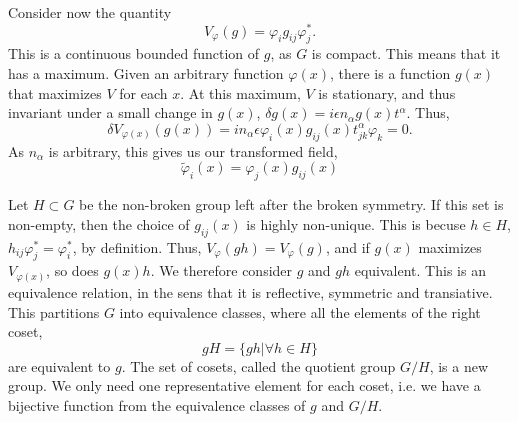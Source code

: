 Consider now the quantity
\begin{equation}
    V_{\varphi}(g) = \varphi_i g_{ij} \varphi^*_j.
\end{equation}
This is a continuous bounded function of $g$, as $G$ is compact.
This means that it has a maximum.
Given an arbitrary function $\varphi(x)$, there is a function $g(x)$ that maximizes $V$ for each $x$.
At this maximum, $V$ is stationary, and thus invariant under a small change in $g(x)$, 
$\delta g(x) = i \epsilon n_\alpha g(x) t^\alpha$.
Thus,
\begin{equation}
    \delta V_{\varphi(x)}(g(x)) = i n_\alpha \epsilon \varphi_i(x) g_{ij}(x) t^\alpha_{jk} \varphi_k = 0.
\end{equation}
As $n_\alpha$ is arbitrary, this gives us our transformed field,
\begin{equation}
    \tilde \varphi_i(x) = \varphi_j(x) g_{ij}(x)
\end{equation}

Let $H \subset G$ be the non-broken group left after the broken symmetry.
If this set is non-empty, then the choice of $g_{ij}(x)$ is highly non-unique.
This is becuse $h \in H$, $h_{ij} \varphi^*_j = \varphi^*_i$, by definition. 
Thus, $V_\varphi(gh) = V_\varphi(g)$, and if $g(x)$ maximizes $V_{\varphi(x)}$, so does $g(x)h$.
We therefore consider $g$ and $gh$ equivalent.
This is an equivalence relation, in the sens that it is reflective, symmetric and transiative.
This partitions $G$ into equivalence classes, where all the elements of the right coset,
\begin{equation}
    gH = \{g h| \forall h \in H  \}
\end{equation}
are equivalent to $g$.
The set of cosets, called the quotient group $G / H$, is a new group.
We only need one representative element for each coset, i.e. we have a bijective function from the equivalence classes of $g$ and $G / H$.


